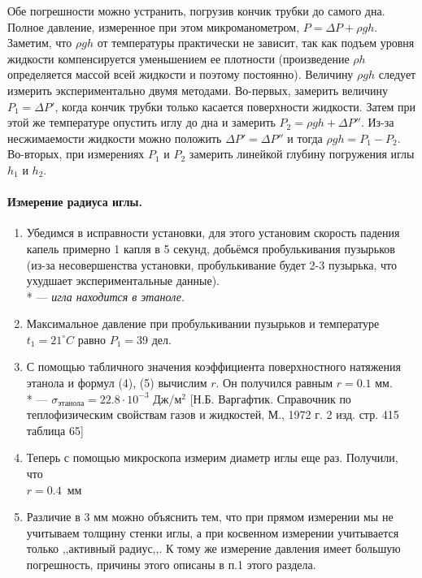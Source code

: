 \documentclass{letnab}
\begin{document}
Обе погрешности можно устранить, погрузив кончик трубки до самого дна. Полное давление, измеренное при этом микроманометром, $P = \Delta P + \rho gh$. Заметим, что $\rho gh$ от температуры практически не зависит, так как подъем уровня жидкости компенсируется уменьшением ее плотности (произведение $\rho h$ определяется массой всей жидкости и поэтому постоянно). Величину $\rho gh$ следует измерить экспериментально двумя методами. Во-первых, замерить величину $P_1 = \Delta P' $, когда кончик трубки только касается поверхности жидкости. Затем при этой же температуре опустить иглу до дна и замерить $P_2 = \rho gh + \Delta P''$. Из-за несжимаемости жидкости можно положить $\Delta P' = \Delta P''$ и тогда $\rho gh = P_1 - P_2$. Во-вторых, при измерениях $P_1$ и $P_2$ замерить линейкой глубину погружения иглы $h_1$ и $h_2$.
\paragraph{Измерение радиуса иглы.} 
\begin{enumerate}
	\item Убедимся в исправности установки, для этого установим скорость падения капель примерно 1 капля в 5 секунд, добьёмся пробулькивания пузырьков (из-за несовершенства установки, пробулькивание будет 2-3 пузырька, что ухудшает экспериментальные данные).\\
	* --- \textit{игла находится в этаноле.}
	\item Максимальное давление при пробулькивании пузырьков и температуре $t_1 = 21 ^\circ C$ равно $ P_1 = 39$ дел.
	\item С помощью табличного значения коэффициента поверхностного натяжения этанола и формул (4), (5) вычислим $r$. Он получился равным $r = 0.1$ мм.\\
	* --- $\sigma_\text{этанола} = 22.8 \cdot 10^{-3}$ Дж/м$^2$ [Н.Б. Варгафтик. Справочник по теплофизическим свойствам газов и жидкостей, М., 1972 г. 2 изд. стр. 415 таблица 65] 
	\item Теперь с помощью микроскопа измерим диаметр иглы еще раз. Получили, что \\ $r = 0.4$~мм
	\item Различие в 3 мм можно объяснить тем, что при прямом измерении мы не учитываем толщину стенки иглы, а при косвенном измерении учитывается только ,,активный радиус,,. К тому же измерение давления имеет большую погрешность, причины этого описаны в п.1 этого раздела.
\end{enumerate} 
\end{document}
